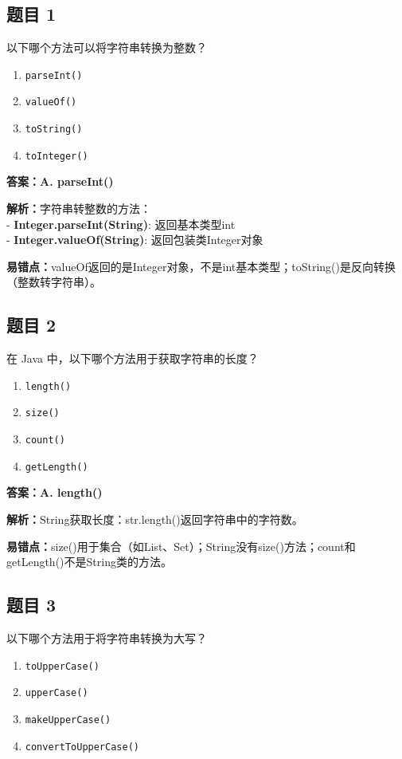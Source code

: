 \documentclass[12pt,a4paper]{ctexart}
\begin{document}
\subsection*{题目 1}
以下哪个方法可以将字符串转换为整数？
\begin{enumerate}[label=\Alph*.]
	\item \texttt{parseInt()}
	\item \texttt{valueOf()}
	\item \texttt{toString()}
	\item \texttt{toInteger()}
\end{enumerate}

\begin{answerbox}
	\textbf{答案：A. parseInt()}

	\textbf{解析：}字符串转整数的方法：\\
	- \textbf{Integer.parseInt(String)}: 返回基本类型int\\
	- \textbf{Integer.valueOf(String)}: 返回包装类Integer对象

	\textbf{易错点：}valueOf返回的是Integer对象，不是int基本类型；toString()是反向转换（整数转字符串）。
\end{answerbox}

\subsection*{题目 2}
在 Java 中，以下哪个方法用于获取字符串的长度？
\begin{enumerate}[label=\Alph*.]
	\item \texttt{length()}
	\item \texttt{size()}
	\item \texttt{count()}
	\item \texttt{getLength()}
\end{enumerate}

\begin{answerbox}
	\textbf{答案：A. length()}

	\textbf{解析：}String获取长度：str.length()返回字符串中的字符数。

	\textbf{易错点：}size()用于集合（如List、Set）；String没有size()方法；count和getLength()不是String类的方法。
\end{answerbox}

\subsection*{题目 3}
以下哪个方法用于将字符串转换为大写？
\begin{enumerate}[label=\Alph*.]
	\item \texttt{toUpperCase()}
	\item \texttt{upperCase()}
	\item \texttt{makeUpperCase()}
	\item \texttt{convertToUpperCase()}
\end{enumerate}
\end{document}

